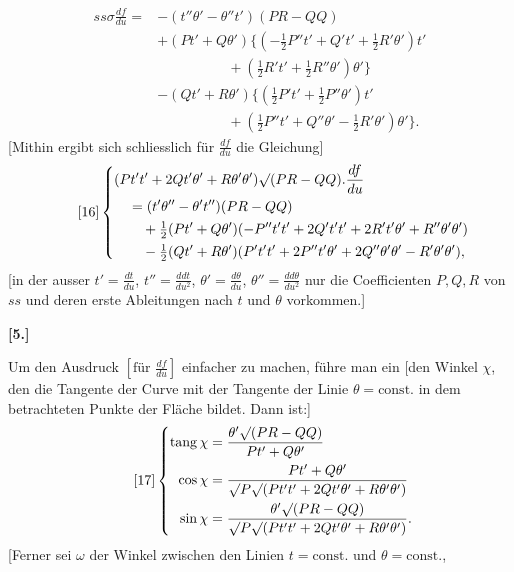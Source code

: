%
\[
\begin{aligned}
ss\sigma\frac{df}{du}={}&-(t''\theta'-\theta''t')(PR-QQ)\\
&+(Pt'+Q\theta')\{(-\tfrac12P''t'+Q't'+\tfrac12R'\theta')t'\\
&\hspace{5em}+(\tfrac12R't'+\tfrac12R''\theta')\theta'\}\\
&-(Qt'+R\theta')\{(\tfrac12P't'+\tfrac12P''\theta')t'\\
&\hspace{5em}+(\tfrac12P''t'+Q''\theta'-\tfrac12R'\theta')\theta'\}.
\end{aligned}
\]
[Mithin ergibt sich schliesslich für $\frac{df}{du}$ die Gleichung]
\begin{equation}\tag*{[16]}
\left\{\begin{aligned}
&(Pt't'+2Qt'\theta'+R\theta'\theta')\mathord{\surd}(PR-QQ).\frac{df}{du}\\
&\quad=(t'\theta''-\theta't'')(PR-QQ)\\
&\qquad+\tfrac12(Pt'+Q\theta')(-P''t't'+2Q't't'+2R't'\theta'+R''\theta'\theta')\\
&\qquad-\tfrac12(Qt'+R\theta')(P't't'+2P''t'\theta'+2Q''\theta'\theta'-R'\theta'\theta'),
\end{aligned}\right.
\end{equation}
[in der ausser $t'=\frac{dt}{du}$, $t''=\frac{ddt}{du^2}$, $\theta'=\frac{d\theta}{du}$, $\theta''=\frac{dd\theta}{du^2}$ nur die Coefficienten $P,Q,R$ von $ss$ und deren erste Ableitungen nach $t$ und $\theta$ vorkommen.]
\begin{center}\bfseries [5.]\end{center}
\noindent\hspace*{1.2em}Um den Ausdruck $\left[\text{für }\frac{df}{du}\right]$ einfacher zu machen, führe man ein [den Winkel $\chi$, den die Tangente der Curve mit der Tangente der Linie $\theta=\text{const.}$ in dem betrachteten Punkte der Fläche bildet. Dann ist:]
\begin{equation}\tag*{[17]}
\left\{\begin{aligned}
\operatorname{tang}\chi&=\frac{\theta'\mathord{\surd}(PR-QQ)}{Pt'+Q\theta'}\\
\cos\chi&=\frac{Pt'+Q\theta'}{\mathord{\surd}P\mathord{\surd}(Pt't'+2Qt'\theta'+R\theta'\theta')}\\
\sin\chi&=\frac{\theta'\mathord{\surd}(PR-QQ)}{\mathord{\surd}P\mathord{\surd}(Pt't'+2Qt'\theta'+R\theta'\theta')}.
\end{aligned}\right.
\end{equation}
[Ferner sei $\omega$ der Winkel zwischen den Linien $t=\text{const.}$ und $\theta=\text{const.}$,
